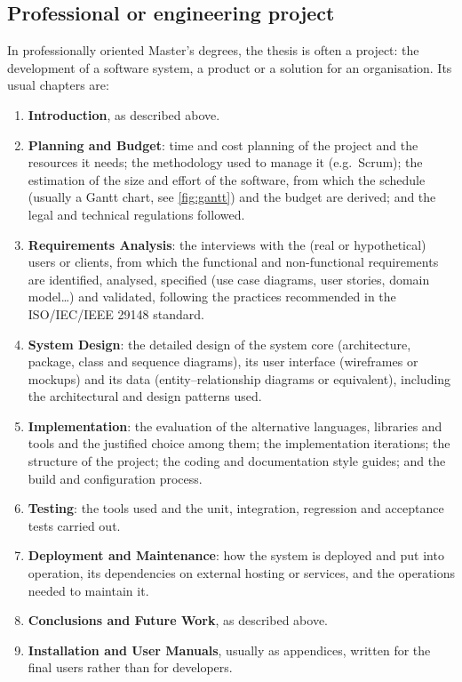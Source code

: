 \subsection{Professional or engineering project}\label{sec:project-thesis}

In professionally oriented Master's degrees, the thesis is often a project: the development
of a software system, a product or a solution for an organisation. Its usual chapters are:

\begin{enumerate}
  \item \textbf{Introduction}, as described above.
  \item \textbf{Planning and Budget}: time and cost planning of the project and the
        resources it needs; the methodology used to manage it (e.g.\ Scrum); the
        estimation of the size and effort of the software, from which the schedule (usually
        a Gantt chart, see \autoref{fig:gantt}) and the budget are derived; and the legal
        and technical regulations followed.
  \item \textbf{Requirements Analysis}: the interviews with the (real or hypothetical)
        users or clients, from which the functional and non-functional requirements are
        identified, analysed, specified (use case diagrams, user stories, domain
        model\dots) and validated, following the practices recommended in the
        ISO/IEC/IEEE 29148 standard.
  \item \textbf{System Design}: the detailed design of the system core (architecture,
        package, class and sequence diagrams), its user interface (wireframes or mockups)
        and its data (entity--relationship diagrams or equivalent), including the
        architectural and design patterns used.
  \item \textbf{Implementation}: the evaluation of the alternative languages, libraries and
        tools and the justified choice among them; the implementation iterations; the
        structure of the project; the coding and documentation style guides; and the build
        and configuration process.
  \item \textbf{Testing}: the tools used and the unit, integration, regression and
        acceptance tests carried out.
  \item \textbf{Deployment and Maintenance}: how the system is deployed and put into
        operation, its dependencies on external hosting or services, and the operations
        needed to maintain it.
  \item \textbf{Conclusions and Future Work}, as described above.
  \item \textbf{Installation and User Manuals}, usually as appendices, written for the
        final users rather than for developers.
\end{enumerate}

